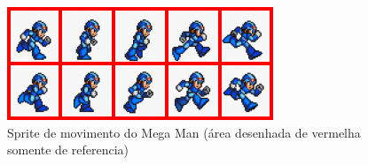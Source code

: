 \begin{figure}[h!]
    \centering
    \includegraphics[width=1\linewidth]{figuras/megaman-sprite-animation-export.png}
    \caption{Sprite de movimento do Mega Man (área desenhada de vermelha somente de referencia)}
    \label{fig:sprite-animation}
\end{figure}












